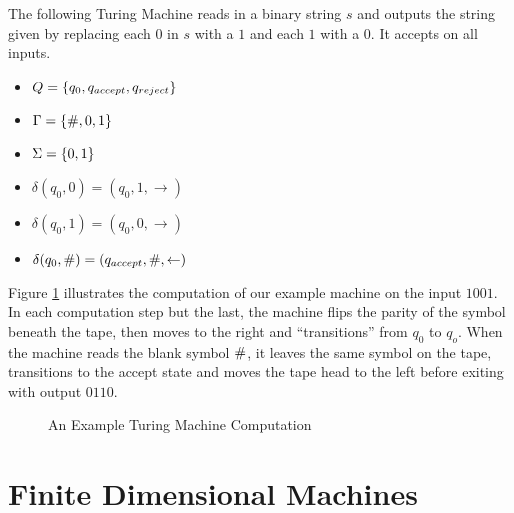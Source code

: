 \begin{example}
  The following Turing Machine reads in a binary string $s$ and
  outputs the string given by replacing each $0$ in $s$ with a $1$ and
  each $1$ with a $0$.  It accepts on all inputs.

  \begin{itemize}
  \item $Q = \{q_0, q_{accept}, q_{reject}\}$
  \item $\Gamma = \{\#, 0, 1\}$
  \item $\Sigma = \{0,1\}$
  \item $\delta(q_0, 0) = (q_0, 1, \rightarrow)$
  \item $\delta(q_0, 1) = (q_0, 0, \rightarrow)$
  \item $\delta(q_0, \#) = (q_{accept}, \#, \leftarrow)$
  \end{itemize}

  Figure \ref{fig:turing-example} illustrates the computation of our
  example machine on the input $1001$. In each computation step but
  the last, the machine flips the parity of the symbol beneath the
  tape, then moves to the right and ``transitions'' from $q_0$ to
  $q_o$.  When the machine reads the blank symbol $\#$, it leaves
  the same symbol on the tape, transitions to the accept state and
  moves the tape head to the left before exiting with output $0110$.

  \begin{figure}[p]
    \begin{center}
       \vspace{1mm}
       \vspace{1mm}
       \vspace{1mm}
       \vspace{1mm}
       \vspace{1mm}
       \vspace{1mm}
    \end{center}
    \caption{An Example Turing Machine Computation}
    \label{fig:turing-example}
  \end{figure}
\end{example}

\section{Finite Dimensional Machines}

